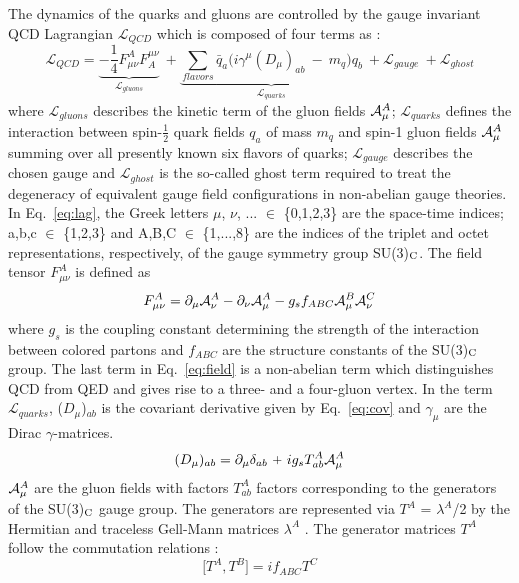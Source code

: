 The dynamics of the quarks and gluons are controlled by the gauge invariant QCD Lagrangian $\mathcal{L}_{QCD}$ which is composed of four terms as : 
\begin{equation}
\mathcal{L}_{QCD} = \underbrace{-\frac{1}{4}F^A_{\mu\nu}F^{\mu\nu}_A}_\text{$\mathcal{L}_{gluons}$}~\plus \underbrace{\sum\limits_{flavors}^{} \bar{q}_a \big(i\gamma^\mu (D_\mu)_{ab}~-~m_q\big)q_b}_\text{$\mathcal{L}_{quarks}$}~\plus \mathcal{L}_{gauge}~\plus\mathcal{L}_{ghost}
\label{eq:lag}
\end{equation}
where $\mathcal{L}_{gluons}$ describes the kinetic term of the gluon fields ${\cal A}^A_\mu$; $\mathcal{L}_{quarks}$ defines the interaction between spin-$\frac{1}{2}$ quark fields $q_a$ of mass $m_q$ and spin-1 gluon fields ${\cal A}^A_\mu$ summing over all presently known six flavors of quarks; $\mathcal{L}_{gauge}$ describes the chosen gauge and $\mathcal{L}_{ghost}$ is the so-called ghost term required to treat the degeneracy of equivalent gauge field configurations in non-abelian gauge theories. In Eq.~\ref{eq:lag}, the Greek letters $\mu$, $\nu$, ... $\in$ \{0,1,2,3\} are the space-time indices; a,b,c $\in$ \{1,2,3\} and A,B,C $\in$ \{1,...,8\} are the indices of the triplet and octet representations, respectively, of the gauge symmetry group SU(3)$_{\rm C}$. The field tensor $F^A_{\mu\nu}$ is defined as
\begin{equation}
F^A_{\mu\nu} = \partial_\mu {\cal A}^A_\nu - \partial_\nu {\cal A}^A_\mu - g_s f_{ABC}{\cal A}^B_\mu {\cal A}^C_\nu
\label{eq:field}
\end{equation}
where $g_s$ is the coupling constant determining the strength of the interaction between colored partons and $f_{ABC}$ are the structure constants of the SU(3)$_{\rm C}$ group. The last term in Eq.~\ref{eq:field} is a non-abelian term which distinguishes QCD from QED and gives rise to a three- and a four-gluon vertex. In the term $\mathcal{L}_{quarks}$, ($D_\mu$)$_{ab}$ is the covariant derivative given by Eq.~\ref{eq:cov} and $\gamma_\mu$ are the Dirac $\gamma$-matrices. 
\begin{equation}
(D_\mu)_{ab} = \partial_{\mu}\delta_{ab}~\plus ig_sT^A_{ab}{\cal A}^A_\mu
\label{eq:cov}
\end{equation}
${\cal A}^A_\mu$ are the gluon fields with factors $T^A_{ab}$ factors corresponding to the generators of the SU(3)$_{\rm C}$ gauge group. The generators are represented via $T^A$ = $\lambda^A$/2 by the Hermitian and traceless Gell-Mann matrices $\lambda^A$ \cite{GellMann:1962xb}. The generator matrices $T^A$ follow the commutation relations :
\begin{equation}
\bigg[T^A,T^B\bigg] = if_{ABC}T^C
\end{equation}

